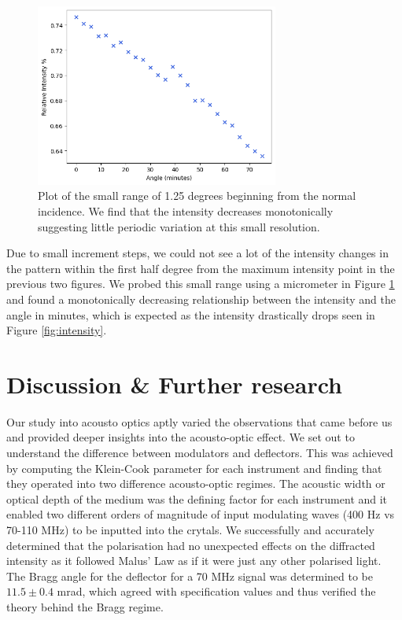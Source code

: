 \documentclass[aps,prl,reprint,10pt,amsmath,amssymb,superscriptaddress,a4paper]{revtex4-2}
\begin{document}
\begin{figure} [!htbp]
    \includegraphics[width = 8cm]{../Figures/intensity3.png}
    \caption{Plot of the small range of 1.25 degrees beginning from the normal incidence. We find that the intensity decreases monotonically suggesting 
    little periodic variation at this small resolution.}
    \label{fig:intensity3}
\end{figure}

Due to small increment steps, we could not see a lot of the intensity changes in the pattern within the first half degree from the maximum intensity point in the previous two figures. We probed this small range using a micrometer
in Figure \ref{fig:intensity3} and found a monotonically decreasing relationship between the intensity and the angle in minutes, which is expected as the intensity drastically drops seen in Figure \ref{fig:intensity}.

\section{Discussion \& Further research}

Our study into acousto optics aptly varied the observations that came before us and provided deeper insights into the acousto-optic effect. We set out to understand the difference between modulators and deflectors. This was achieved 
by computing the Klein-Cook parameter for each instrument and finding that they operated into two difference acousto-optic regimes. The acoustic width or optical depth of the medium was the defining factor for each instrument and it 
enabled two different orders of magnitude of input modulating waves (400 Hz vs 70-110 MHz) to be inputted into the crytals. We successfully and accurately determined that the polarisation had no unexpected effects on the diffracted 
intensity as it followed Malus' Law as if it were just any other polarised light. The Bragg angle for the deflector for a 70 MHz signal was determined to be $11.5 \pm 0.4$ mrad, which agreed with specification values and thus verified 
the theory behind the Bragg regime. 
\end{document}

